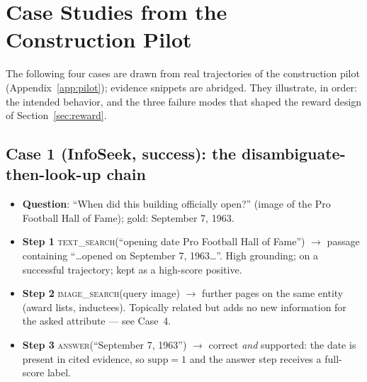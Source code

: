 \documentclass[letterpaper,twocolumn,10pt]{article}
\begin{document}
\section{Case Studies from the Construction Pilot}
\label{app:cases}

The following four cases are drawn from real trajectories of the
construction pilot (Appendix~\ref{app:pilot}); evidence snippets are
abridged. They illustrate, in order: the intended behavior, and the three
failure modes that shaped the reward design of
Section~\ref{sec:reward}.

\subsection*{Case 1 (InfoSeek, success): the disambiguate-then-look-up chain}
\begin{itemize}
\item \textbf{Question}: ``When did this building officially open?''
(image of the Pro Football Hall of Fame); gold: September 7, 1963.
\item \textbf{Step 1} \textsc{text\_search}(``opening date Pro Football
Hall of Fame'') $\to$ passage containing ``\ldots opened on September 7,
1963\ldots''. High grounding; on a successful trajectory; kept as a
high-score positive.
\item \textbf{Step 2} \textsc{image\_search}(query image) $\to$ further
pages on the same entity (award lists, inductees). Topically related but
adds no new information for the asked attribute --- see Case~4.
\item \textbf{Step 3} \textsc{answer}(``September 7, 1963'') $\to$ correct
\emph{and} supported: the date is present in cited evidence, so
$\mathrm{supp}{=}1$ and the answer step receives a full-score label.
\end{itemize}
\end{document}
